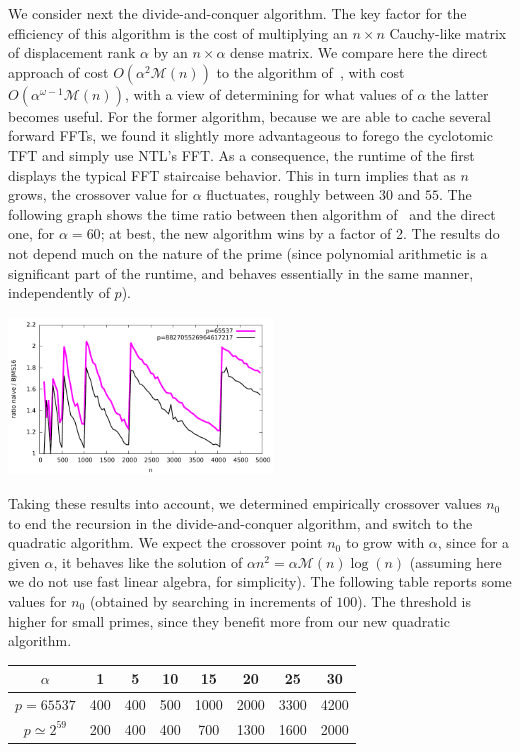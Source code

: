 \documentclass{sig-alternate}
\newcommand{\M}{\ensuremath{\mathscr{M}}}
\begin{document}
We consider next the divide-and-conquer algorithm. The key factor for
the efficiency of this algorithm is the cost of multiplying an $n
\times n$ Cauchy-like matrix of displacement rank $\alpha$ by an $n
\times \alpha$ dense matrix. We compare here the direct approach of
cost $O(\alpha^2 \M(n))$ to the algorithm of~\cite{BoJeMoSc16}, with
cost $O(\alpha^{\omega-1} \M(n))$, with a view of determining for what
values of $\alpha$ the latter becomes useful. For the former
algorithm, because we are able to cache several forward FFTs, we found
it slightly more advantageous to forego the cyclotomic TFT and simply
use NTL's FFT. As a consequence, the runtime of the first displays the
typical FFT staircaise behavior. This in turn implies that as $n$
grows, the crossover value for $\alpha$ fluctuates, roughly between
$30$ and $55$. The following graph shows the time ratio between then algorithm
of~\cite{BoJeMoSc16} and the direct one, for $\alpha=60$; at
best, the new algorithm wins by a factor of 2. The results do not
depend much on the nature of the prime (since polynomial arithmetic is
a significant part of the runtime, and behaves essentially in the same
manner, independently of $p$).

\includegraphics[width=7cm]{ratio-mul-matrix-eschost-desktop.pdf}

Taking these results into account, we determined empirically crossover
values $n_0$ to end the recursion in the divide-and-conquer algorithm,
and switch to the quadratic algorithm. We expect the crossover point
$n_0$ to grow with $\alpha$, since for a given $\alpha$, it behaves
like the solution of $\alpha n^2 = \alpha \M(n) \log(n)$ (assuming
here we do not use fast linear algebra, for simplicity). The following 
table reports some values for $n_0$ (obtained by searching in increments of $100$).
The threshold is higher for small primes, since they benefit more from 
our new quadratic algorithm.

\begin{center}
{\small
\begin{tabular}{|c||c|c|c|c|c|c|c|}\hline
  $\alpha$ & 1 & 5 & 10 & 15 & 20 & 25 &30 \\\hline\hline
$p=65537$  & 400 &400 &500  &1000  &2000  &3300  &4200 \\\hline
$p\simeq 2^{59}$  & 200 & 400 & 400 & 700 & 1300 & 1600 & 2000\\\hline
\end{tabular}
}
\end{center}
\end{document}
